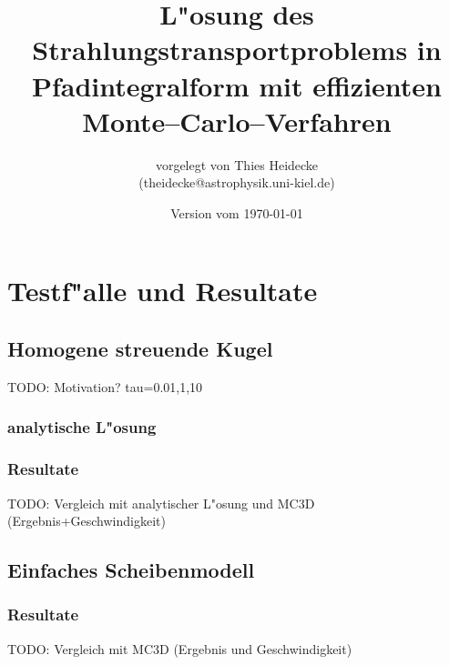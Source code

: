 \documentclass[
	12pt,
	a4paper,
	DIVcalc,
	titlepage,
	twoside,
	liststotoc,
	bibtotocnumbered
]{scrbook}
\begin{document}
\frontmatter
	\titlehead{Christian--Albrechts--Universit"at zu Kiel\\ Institut f"ur Theoretische Physik und Astrophysik}
	\subject{Diplomarbeit}
	\title{L"osung des Strahlungstransportproblems in Pfadintegralform mit effizienten Monte--Carlo--Verfahren}
	\author{vorgelegt von Thies Heidecke\\(theidecke@astrophysik.uni-kiel.de)}
	\publishers{betreut durch Prof. Sebastian Wolf}
	\date{Version vom \today}
	\maketitle

	\tableofcontents	%

	\newcommand{\location}[1]{\mathbf{#1}}
	\newcommand{\scatter}[1]{\overset{#1}{\leftrightsquigarrow}}
	\newcommand{\normalized}[1]{\frac{#1}{||#1||}}

\mainmatter
	
	
	
	
	
	
	\chapter{Testf"alle und Resultate}
	\section{Homogene streuende Kugel}
	TODO: Motivation? tau=0.01,1,10
	\subsection{analytische L"osung}
	\subsection{Resultate}
	TODO: Vergleich mit analytischer L"osung und MC3D (Ergebnis+Geschwindigkeit)
	\section{Einfaches Scheibenmodell}
	\subsection{Resultate}
	TODO: Vergleich mit MC3D (Ergebnis und Geschwindigkeit)
\end{document}
